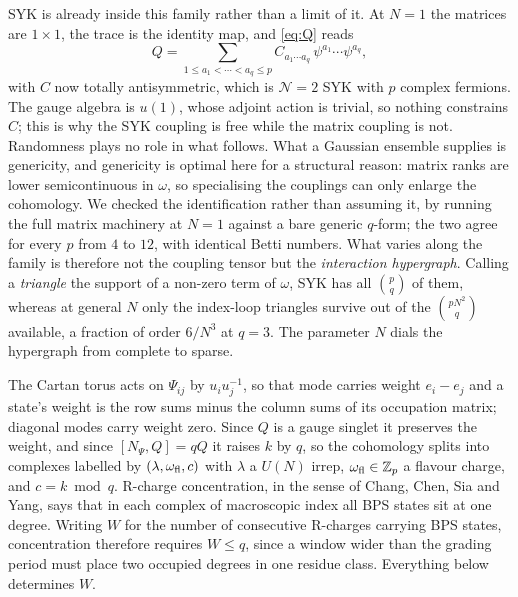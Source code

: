 \documentclass[10pt]{article}
\begin{document}
SYK is already inside this family rather than a limit of it. At $N=1$ the matrices are $1\times1$, the trace is
the identity map, and \eqref{eq:Q} reads
\begin{equation}
Q=\sum_{1\le a_1<\cdots<a_q\le p}C_{a_1\cdots a_q}\,\psi^{a_1}\cdots\psi^{a_q},
\end{equation}
with $C$ now totally antisymmetric, which is $\mathcal N=2$ SYK with $p$ complex fermions. The gauge algebra is $u(1)$, whose adjoint action is
trivial, so nothing constrains $C$; this is why the SYK coupling is free while the matrix coupling is not.
Randomness plays no role in what follows. What a Gaussian ensemble supplies is genericity, and genericity is
optimal here for a structural reason: matrix ranks are lower semicontinuous in $\omega$, so specialising the
couplings can only enlarge the cohomology. We checked the identification rather than assuming it, by running the
full matrix machinery at $N=1$ against a bare generic $q$-form; the two agree for every $p$ from $4$ to $12$,
with identical Betti numbers. What varies along the family is therefore not the coupling tensor but the
\emph{interaction hypergraph}. Calling a \emph{triangle} the support of a non-zero term of $\omega$, SYK has all
$\binom pq$ of them, whereas at general $N$ only the index-loop triangles survive out of the $\binom{pN^2}{q}$
available, a fraction of order $6/N^3$ at $q=3$. The parameter $N$ dials the hypergraph from complete to sparse.

The Cartan torus acts on $\Psi_{ij}$ by $u_iu_j^{-1}$, so that mode carries weight $e_i-e_j$ and a state's weight
is the row sums minus the column sums of its occupation matrix; diagonal modes carry weight zero. Since $Q$ is a
gauge singlet it preserves the weight, and since $[N_\Psi,Q]=qQ$ it raises $k$ by $q$, so the cohomology splits
into complexes labelled by $(\lambda,\omega_{\rm fl},c)$ with $\lambda$ a $U(N)$ irrep, $\omega_{\rm fl}\in\mathbb
Z_p$ a flavour charge, and $c=k\bmod q$. R-charge concentration, in the sense of Chang, Chen, Sia and Yang, says
that in each complex of macroscopic index all BPS states sit at one degree. Writing $W$ for the number of
consecutive R-charges carrying BPS states, concentration therefore requires $W\le q$, since a window wider than
the grading period must place two occupied degrees in one residue class. Everything below determines $W$.
\end{document}
